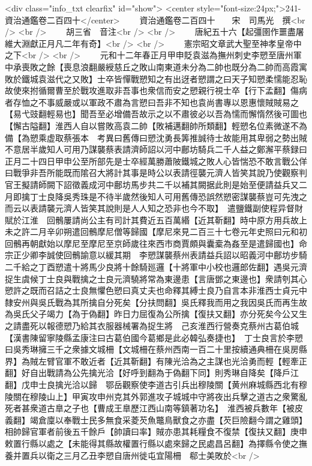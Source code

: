 <div class="info_txt clearfix" id="show">
<center style="font-size:24px;">241-資治通鑑卷二百四十</center>
  　　資治通鑑卷二百四十　　宋　司馬光　撰<br />
<br />
　　胡三省　音注<br />
<br />
　　唐紀五十六【起彊圉作噩盡屠維大淵獻正月凡二年有奇】<br />
<br />
　　憲宗昭文章武大聖至神孝皇帝中之下<br />
<br />
　　元和十二年春正月甲申貶袁滋為撫州刺史李愬至唐州軍中承喪敗之餘【喪息浪翻嚴綬慈丘之敗山南東道未分為二帥也既分為二帥而高霞寓敗於鐵城袁滋代之又敗】士卒皆憚戰愬知之有出迓者愬謂之曰天子知愬柔懦能忍恥故使來拊循爾曹至於戰攻進取非吾事也衆信而安之愬親行視士卒【行下孟翻】傷病者存恤之不事威嚴或以軍政不肅為言愬曰吾非不知也袁尚書專以恩惠懷賊賊易之【易弋豉翻輕易也】聞吾至必增備吾故示之以不肅彼必以吾為懦而懈惰然後可圖也【懈古隘翻】淮西人自以嘗敗高袁二帥【敗補邁翻帥所類翻】輕愬名位素微遂不為備【為愬乘虚取蔡張本　考異曰舊傳曰愬沈勇長筭推誠待士故能用其卑弱之勢出賊不意居半歲知人可用乃謀襲蔡表請濟師詔以河中鄜坊騎兵二千人益之鄭澥平蔡録曰正月二十四日甲申公至所部先是士卒經萬勝蕭陂鐵城之敗人心皆惴恐不敢言戰公佯曰戰爭非吾所能既而隂召大將計其事是時公以表請徑襲元濟人皆笑其說乃使觀察判官王擬請師闕下詔徵義成河中鄜坊馬步共二千以補其闕据此則是始至便請益兵又二月即擒丁士良降吳秀珠是不待半歲然後知人可用舊傳恐誤然愬密謀襲蔡豈可先洩之而云以表請襲元濟人皆笑其說則是人人知之恐非也今不取】　遣鹽鐵副使程异督財賦於江淮　回鶻屢請尚公主有司計其費近五百萬緡【近其靳翻】時中原方用兵故上未之許二月辛卯朔遣回鶻摩尼僧等歸國【摩尼來見二百三十七卷元年史照曰元和初回鶻再朝獻始以摩尼至摩尼至京師歲往來西市商賈頗與囊槖為姦至是遣歸國也】命宗正少卿李誠使回鶻諭意以緩其期　李愬謀襲蔡州表請益兵詔以昭義河中鄜坊步騎二千給之丁酉愬遣十將馬少良將十餘騎廵邏【十將軍中小校也邏郎佐翻】遇吳元濟捉生虞候丁士良與戰擒之士良元濟驍將常為東邊患【言唐鄧之東邊也】衆請刳其心愬許之既而召詰之士良無懼色愬曰真丈夫也命釋其縛士良乃自言本非淮西士貞元中隸安州與吳氏戰為其所擒自分死矣【分扶問翻】吳氏釋我而用之我因吳氏而再生故為吳氏父子竭力【為于偽翻】昨日力屈復為公所擒【復扶又翻】亦分死矣今公又生之請盡死以報德愬乃給其衣服器械署為捉生將　己亥淮西行營奏克蔡州古葛伯城【漢書陳留寧陵縣孟康注曰古葛伯國今葛鄉是此必韓弘奏捷也】　丁士良言於李愬曰吳秀琳擁三千之衆據文城柵【文城柵在蔡州西南一百二十里按續通典柵在吳房縣界】為賊左臂官軍不敢近者【近其靳翻】有陳光洽為之主謀也光洽勇而輕【輕牽正翻】好自出戰請為公先擒光洽【好呼到翻為于偽翻下同】則秀琳自降矣【降戶江翻】戊申士良擒光洽以歸　鄂岳觀察使李道古引兵出穆陵關【黄州麻城縣西北有穆陵關在穆陵山上】甲寅攻申州克其外郭進攻子城城中守將夜出兵擊之道古之衆驚亂死者甚衆道古臯之子也【曹成王臯歷江西山南等鎮著功名】　淮西被兵數年【被皮義翻】竭倉廩以奉戰士民多無食采菱芡魚鼈鳥獸食之亦盡【芡巨險翻今謂之雞頭】相帥歸官軍者前後五千餘戶【帥讀曰率】賊亦患其耗糧食不復禁【復扶又翻】庚申敕置行縣以處之【未能得其縣故權置行縣以處來歸之民處昌呂翻】為擇縣令使之撫養并置兵以衛之三月乙丑李愬自唐州徙屯宜陽柵　郗士美敗於<br />
